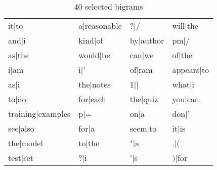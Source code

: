 \documentclass[fullpage]{article}
\begin{document}
\begin{table}[h]
\begin{center}
\begin{tabular}{ l | l | l | l}
it|to & a|reasonable & ?|/ & will|the \\
and|i&kind|of&by|author&pm|/ \\
as|the&would|be&can|we&of|the\\
i|am&i|'&of|ram&appears|to\\
as|i&the|notes&1|$|$&what|i\\
to|do&for|each&the|quiz&you|can\\
training|examples&p|=&on|a&don|'\\
see|also&for|a&seem|to&it|is\\
the|model&to|the&"|a&.|$($\\
test|set& ?|i & '|s & $)$|for\\
\end{tabular}
\caption{40 selected bigrams}
\end{center}
\end{table}
\end{document}
